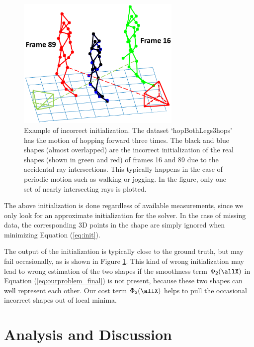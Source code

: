 \begin{figure}
\centering
\includegraphics[width=0.70\textwidth]{chapter5/resource/wrong_init.pdf}
\caption[Example of incorrect initialization.]{Example of incorrect initialization. The dataset `hopBothLegs3hops' \cite{cg-2007-2} has the motion of hopping forward three times. The black and blue shapes (almost overlapped) are the incorrect initialization of the real shapes (shown in green and red) of frames 16 and 89 due to the accidental ray intersections. This typically happens in the case of  periodic motion such as walking or jogging. In the figure, only one set of nearly intersecting rays is plotted.}
\label{fig:init}
\end{figure}

The above initialization is done regardless of available measurements, since we only look for an approximate initialization for the solver. In the case of missing data, the corresponding 3D points in the shape are simply ignored when minimizing Equation (\ref{eq:init}).

The output of the initialization is typically close to the ground truth, but may fail occasionally, as is shown in Figure \ref{fig:init}. This kind of wrong initialization may lead to wrong estimation of the two shapes if the smoothness term $\Phi_2(\allX)$ in Equation (\ref{eq:ourproblem_final}) is not present, because these two shapes can well represent each other. Our cost term $\Phi_2(\allX)$ helps to pull the occasional incorrect shapes out of local minima.



\section{Analysis and Discussion}	\label{sec:reconstructability}

